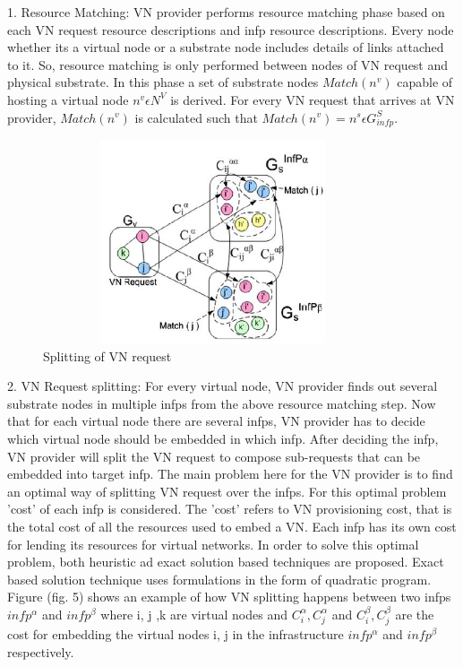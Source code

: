 \documentclass[article,dr=phil,type=msc ,colorback,accentcolor=tud4b]{tudthesis}
\begin{document}
1. Resource Matching: VN provider performs resource matching phase based on each VN request resource descriptions and infp resource descriptions. Every node whether its a virtual node or a substrate node includes details of links attached to it. So, resource matching is only performed between nodes of VN request and physical substrate. 	In this phase a set of substrate nodes $Match(n^{v})$ capable of hosting a virtual node $n^{v} \epsilon N^{V}$ is derived. For every VN request that arrives at VN provider, $Match(n^{v})$ is calculated such that $Match(n^{v}) = {n^{s}} \epsilon G^{S}_{infp}$.\newline

\begin{figure}[h]
	\centering
	\includegraphics[width=10cm, height=6cm]{vn_splitting.jpg}
	\caption{Splitting of VN request}
	\label{fig: VN splitting}
\end{figure}


2. VN Request splitting: For every virtual node, VN provider finds out several substrate nodes in multiple infps from the above resource matching step. Now that for each virtual node there are several infps, VN provider has to decide which virtual node should be embedded in which infp. After deciding the infp, VN provider will split the VN request to compose sub-requests that can be embedded into target infp. The main problem here for the VN provider is to find an optimal way of splitting VN request over the infps. For this optimal problem 'cost' of each infp is considered. The 'cost' refers to VN provisioning cost, that is the total cost of all the resources used to embed a VN. Each infp has its own cost for lending its resources for virtual networks. In order to solve this optimal problem, both heuristic ad exact solution based techniques are proposed. Exact based solution technique uses formulations in the form of quadratic program. Figure (fig. 5) shows an example of how VN splitting happens between two infps $infp^{\alpha}$ and $infp^{\beta}$ where i, j ,k are virtual nodes and $C_{i}^{\alpha}, C_{j}^{\alpha}$ and $C_{i}^{\beta}, C_{j}^{\beta}$ are the cost for embedding the virtual nodes i, j in the infrastructure $infp^{\alpha}$ and $infp^{\beta}$ respectively.\newline
\end{document}
